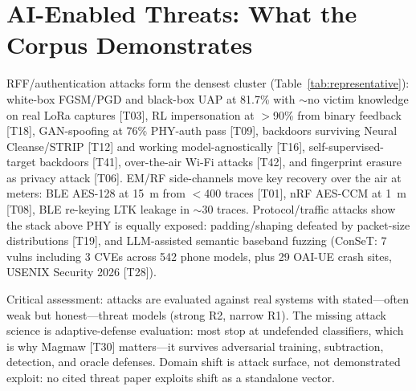 \documentclass[11pt,a4paper]{article}
\begin{document}
\section{AI-Enabled Threats: What the Corpus Demonstrates}
\label{sec:threat}
RFF/authentication attacks form the densest cluster (Table~\ref{tab:representative}): white-box FGSM/PGD and black-box UAP at 81.7\% with $\sim$no victim knowledge on real LoRa captures [T03], RL impersonation at $>$90\% from binary feedback [T18], GAN-spoofing at 76\% PHY-auth pass [T09], backdoors surviving Neural Cleanse/STRIP [T12] and working model-agnostically [T16], self-supervised-target backdoors [T41], over-the-air Wi-Fi attacks [T42], and fingerprint erasure as privacy attack [T06]. EM/RF side-channels move key recovery over the air at meters: BLE AES-128 at 15~m from $<$400 traces [T01], nRF AES-CCM at 1~m [T08], BLE re-keying LTK leakage in $\sim$30 traces. Protocol/traffic attacks show the stack above PHY is equally exposed: padding/shaping defeated by packet-size distributions [T19], and LLM-assisted semantic baseband fuzzing (ConSeT: 7 vulns including 3 CVEs across 542 phone models, plus 29 OAI-UE crash sites, USENIX Security 2026 [T28]).

Critical assessment: attacks are evaluated against real systems with stated---often weak but honest---threat models (strong R2, narrow R1). The missing attack science is adaptive-defense evaluation: most stop at undefended classifiers, which is why Magmaw [T30] matters---it survives adversarial training, subtraction, detection, and oracle defenses. Domain shift is attack surface, not demonstrated exploit: no cited threat paper exploits shift as a standalone vector.
\end{document}

